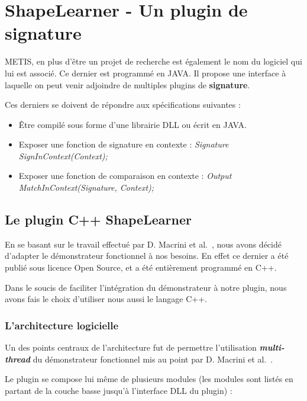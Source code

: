 \section{ShapeLearner - Un plugin de signature}

METIS, en plus d'être un projet de recherche est également le nom du logiciel qui lui est associé. Ce dernier est programmé en JAVA. Il propose une interface à laquelle on peut venir adjoindre de multiples plugins de \textbf{signature}.

Ces derniers se doivent de répondre aux spécifications suivantes :
\begin{itemize}
	\item Être compilé sous forme d'une librairie DLL ou écrit en JAVA.
	\item Exposer une fonction de signature en contexte : \textit{Signature SignInContext(Context);}
	\item Exposer une fonction de comparaison en contexte : \textit{Output MatchInContext(Signature, Context);}
\end{itemize}

\subsection{Le plugin C++ ShapeLearner}

En se basant sur le travail effectué par D. Macrini et al.~\cite{Macrini2002}, nous avons décidé d'adapter le démonstrateur fonctionnel à nos besoins. En effet ce dernier a été publié sous licence Open Source, et a été entièrement programmé en C++.

Dans le soucis de faciliter l'intégration du démonstrateur à notre plugin, nous avons fais le choix d'utiliser nous aussi le langage C++.

\subsubsection{L'architecture logicielle}

Un des points centraux de l'architecture fut de permettre l'utilisation \textbf{\textit{multi-thread}} du démonstrateur fonctionnel mis au point par  D. Macrini et al.~\cite{Macrini2002}. 

Le plugin se compose lui même de plusieurs modules (les modules sont listés en partant de la couche basse jusqu'à l'interface DLL du plugin) :

